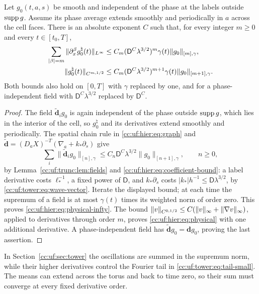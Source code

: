\begin{lemma}\label{cc:uf:hier:lem:physical}
Let \(g_0(t,a,s)\) be smooth and independent of the phase at the labels
outside \(\operatorname{supp} g\). Assume its phase average extends smoothly and
periodically in $a$ across the cell faces. There is an absolute exponent
$C$ such that, for every integer \(m\ge0\) and every $t\in[t_0,T]$,
\begin{align}
 \sum_{|\beta|=m}\|\partial_x^\beta g_0^\natural(t)\|_{L^\infty}
 &\le C_m(\mathsf D^C\lambda^{3/2})^m\gamma(t)
                  \|g_0\|_{[m],\gamma},
 \label{cc:uf:hier:eq:physical-infty}\\
 \|g_0^\natural(t)\|_{C^{m,1/2}}
 &\le C_m(\mathsf D^C\lambda^{3/2})^{m+1}\gamma(t)
                  \|g_0\|_{[m+1],\gamma}.
 \label{cc:uf:hier:eq:physical}
\end{align}
Both bounds also hold on $[0,T]$ with \(\gamma\) replaced by one, and for
a phase-independent field with \(\mathsf D^C\lambda^{3/2}\) replaced by
\(\mathsf D^C\).
\end{lemma}
\begin{proof}
The field \(\widetilde{\mathbf d}_ig_0\) is again independent of the
phase outside \(\operatorname{supp} g\), which lies in the interior of the cell, so
\(g_0^\natural\) and its derivatives extend smoothly and periodically.
The spatial chain rule in \eqref{cc:uf:hier:eq:graph} and
\(\widetilde{\mathbf d}=(D_aX)^{-T}(\nabla_a+k_*\partial_s)\) give
\[
 \sum_i\|\widetilde{\mathbf d}_ig_0\|_{[n],\gamma}
 \le C_n\mathsf D^C\lambda^{3/2}\|g_0\|_{[n+1],\gamma},\qquad n\ge0,
\]
by Lemma~\ref{cc:uf:trunc:lem:fields} and
\eqref{cc:uf:hier:eq:coefficient-bound}: a label derivative costs
$\ell_*^{-1}$, a fixed power of $\mathsf D$, and $k_*\partial_s$ costs
$|k_*|h^{-1}\le\mathsf D\lambda^{3/2}$, by
\eqref{cc:uf:tower:eq:wave-vector}.
Iterate the displayed bound; at each time the supremum of a field is at
most $\gamma(t)$ times its weighted norm of order zero. This proves
\eqref{cc:uf:hier:eq:physical-infty}. The bound
\(\|v\|_{C^{0,1/2}}\le C(\|v\|_\infty+\|\nabla v\|_\infty)\),
applied to derivatives through order \(m\), proves
\eqref{cc:uf:hier:eq:physical} with one additional derivative. A
phase-independent field has
\(\widetilde{\mathbf d}g_0=\mathbf dg_0\), proving the last assertion.
\end{proof}

In Section~\ref{cc:uf:sec:tower} the oscillations are summed in the
supremum norm, while their higher derivatives control the Fourier tail
in \eqref{cc:uf:tower:eq:tail-small}. The means can extend across the
torus and back to time zero, so their sum must converge at every fixed
derivative order.

